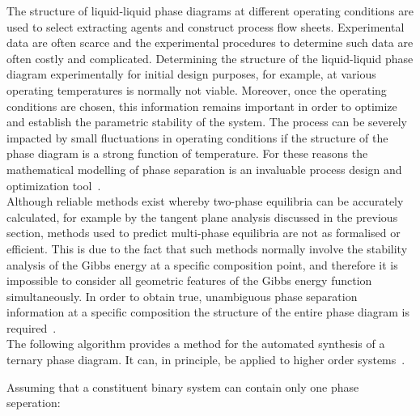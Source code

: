 The structure of liquid-liquid phase diagrams at different operating conditions are used to select extracting agents and construct process flow sheets. Experimental data are often scarce and the experimental procedures to determine such data are often costly and complicated. Determining the structure of the liquid-liquid phase diagram experimentally for initial design purposes, for example, at various operating temperatures is normally not viable. Moreover, once the operating conditions are chosen, this information remains important in order to optimize and establish the parametric stability of the system. The process can be severely impacted by small fluctuations in operating conditions if the structure of the phase diagram is a strong function of temperature. For these reasons the mathematical modelling of phase separation is an invaluable process design and optimization tool~\cite{HessianPhaseEquilibriumCriterion, HessianPhaseDiagramConstruction}.\\

Although reliable methods exist whereby two-phase equilibria can be accurately calculated, for example by the tangent plane analysis discussed in the previous section, methods used to predict multi-phase equilibria are not as formalised or efficient. This is due to the fact that such methods normally involve the stability analysis of the Gibbs energy at a specific composition point, and therefore it is impossible to consider all geometric features of the Gibbs energy function simultaneously. In order to obtain true, unambiguous  phase separation information at a specific composition the structure of the entire phase diagram is required~\cite{HessianPhaseDiagramConstruction}.\\

The following algorithm provides a method for the automated synthesis of a ternary phase diagram. It can, in principle, be applied to higher order systems~\cite{HessianPhaseDiagramConstruction}.\

Assuming that a constituent binary system can contain only one phase seperation:

